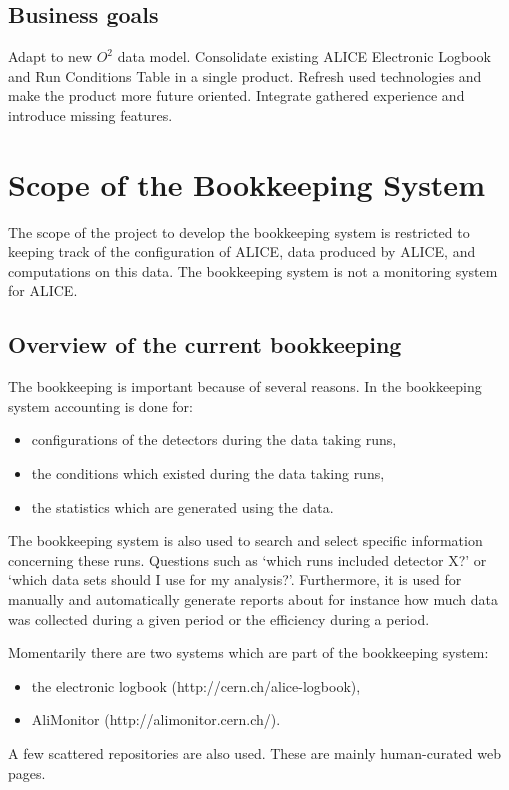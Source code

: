 \subsection{Business goals}
Adapt to new $O^2$ data model. Consolidate existing ALICE Electronic Logbook and Run Conditions Table in a single product. Refresh used technologies and make the product more future oriented. Integrate gathered experience and introduce missing features. 



\section{Scope of the Bookkeeping System}
The scope of the project to develop the bookkeeping system is restricted to keeping track of the configuration of ALICE, data produced by ALICE, and computations on this data. The bookkeeping system is not a monitoring system for ALICE.


\subsection{Overview of the current bookkeeping}

The bookkeeping is important because of several reasons. In the bookkeeping system accounting is done for:
\begin{itemize}
  \item configurations of the detectors during the data taking runs,
  \item the conditions which existed during the data taking runs,
  \item the statistics which are generated using the data.
\end{itemize}

The bookkeeping system is also used to search and select specific information concerning these runs. Questions such as `which runs included detector X?' or `which data sets should I use for my analysis?'. Furthermore, it is used for manually and automatically generate reports about for instance how much data was collected during a given period or the efficiency during a period.

Momentarily there are two systems which are part of the bookkeeping system:
\begin{itemize}
  \item the electronic logbook (http://cern.ch/alice-logbook),
  \item AliMonitor (http://alimonitor.cern.ch/).
\end{itemize}
A few scattered repositories are also used. These are mainly human-curated web pages.


